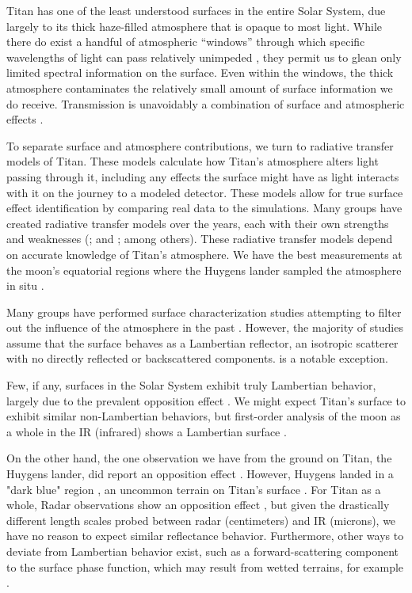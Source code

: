 \documentclass[twocolumn,linenumbers]{aastex631}
\begin{document}
Titan has one of the least understood surfaces in the entire Solar System, due largely to its thick haze-filled atmosphere that is opaque to most light. While there do exist a handful of atmospheric ``windows'' through which specific wavelengths of light can pass relatively unimpeded \citep{Barnes2007}, they permit us to glean only limited spectral information on the surface. Even within the windows, the thick atmosphere contaminates the relatively small amount of surface information we do receive. Transmission is unavoidably a combination of surface and atmospheric effects \citep{EsSayeh2023}. 

To separate surface and atmosphere contributions, we turn to radiative transfer models of Titan. These models calculate how Titan's atmosphere alters light passing through it, including any effects the surface might have as light interacts with it on the journey to a modeled detector. These models allow for true surface effect identification by comparing real data to the simulations. Many groups have created radiative transfer models over the years, each with their own strengths and weaknesses (\cite{Vinatier2007, Griffith2012, Xu2013, Barnes2018a, Rodriguez2018, Corlies2021, Rannou2021}; and \cite{EsSayeh2023}; among others). These radiative transfer models depend on accurate knowledge of Titan's atmosphere. We have the best measurements at the moon's equatorial regions where the Huygens lander sampled the atmosphere in situ \citep{Tomasko2008}.

Many groups have performed surface characterization studies attempting to filter out the influence of the atmosphere in the past \citep{McCord2006, Buratti2006, Soderblom2009, Kazeminejad2011, Bonnefoy2016, Brossier2018, EsSayeh2023, Solomonidou2024}. However, the majority of studies assume that the surface behaves as a Lambertian reflector, an isotropic scatterer with no directly reflected or backscattered components. \cite{Buratti2006} is a notable exception.

Few, if any, surfaces in the Solar System exhibit truly Lambertian behavior, largely due to the prevalent opposition effect \citep{Deau2009, Schroder2009}. We might expect Titan's surface to exhibit similar non-Lambertian behaviors, but first-order analysis of the moon as a whole in the IR (infrared) shows a Lambertian surface \citep{LeMoulic2019, LeMoulic2012}.

On the other hand, the one observation we have from the ground on Titan, the Huygens lander, did report an opposition effect \citep{Schroder2009, Karkoschka2012}. However, Huygens landed in a "dark blue" region \citep{Rodriguez2006}, an uncommon terrain on Titan's surface \citep{Keller2008}. For Titan as a whole, Radar observations show an opposition effect \citep{Neish2010, Wye2011}, but given the drastically different length scales probed between radar (centimeters) and IR (microns), we have no reason to expect similar reflectance behavior. Furthermore, other ways to deviate from Lambertian behavior exist, such as a forward-scattering component to the surface phase function, which may result from wetted terrains, for example \citep{Dhingra2020}.
\end{document}
